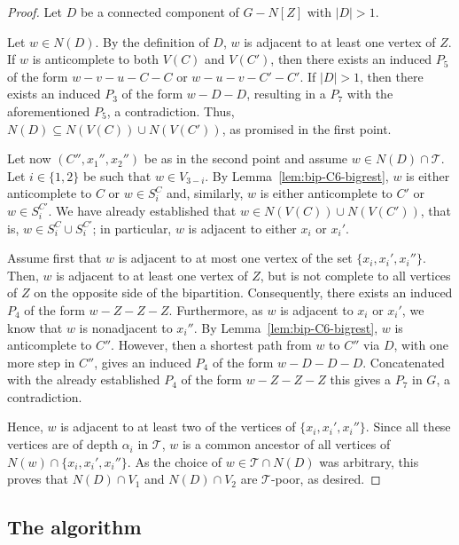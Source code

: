 \documentclass[11pt,a4paper]{article}
\theoremstyle{definition}
\def\T{\mathcal{T}}
\begin{document}
\begin{proof}
    Let $D$ be a connected component of $G-N[Z]$ with $|D| > 1$. 
    
    Let $w \in N(D)$. 
    By the definition of $D$, $w$ is adjacent to at least one vertex
    of $Z$.
    If $w$ is anticomplete to both $V(C)$ and $V(C')$, then 
    there exists an induced $P_5$ of the form $w-v-u-C-C$ or $w-u-v-C'-C'$. 
    If $|D| > 1$, then there exists an induced $P_3$ of the form $w-D-D$,
    resulting in a $P_7$ with the aforementioned $P_5$, a contradiction.
    Thus, $N(D) \subseteq N(V(C)) \cup N(V(C'))$, as promised in the first point.

    Let now $(C'',x_1'',x_2'')$ be as in the second point and assume $w \in N(D) \cap \T$. 
    Let $i \in \{1,2\}$ be such that $w \in V_{3-i}$. 
    By Lemma~\ref{lem:bip-C6-bigrest}, $w$ is either anticomplete to $C$ or
    $w \in S_i^C$ and, similarly, $w$ is either anticomplete to $C'$
    or $w \in S_i^{C'}$. 
    We have already established that $w \in N(V(C)) \cup N(V(C'))$, that is,
    $w \in S_i^C \cup S_i^{C'}$;
    in particular, $w$ is adjacent to either $x_i$ or $x_i'$.

    Assume first that  $w$ is adjacent to at most one vertex of the set  $\{x_i,x_i',x_i''\}$.
    Then, $w$ is adjacent to at least one vertex of $Z$,
    but is not complete to all vertices of $Z$ on the opposite side of the bipartition.
    Consequently, there exists an induced $P_4$ of the form $w-Z-Z-Z$.
    Furthermore, as $w$ is adjacent to $x_i$ or $x_i'$, we know that $w$ is nonadjacent to $x_i''$. 
    By Lemma~\ref{lem:bip-C6-bigrest}, $w$ is anticomplete to $C''$. 
    However, then a shortest path from $w$
    to $C''$ via $D$, with one more step in $C''$, gives an induced $P_4$ of the form $w-D-D-D$.
    Concatenated with the already established $P_4$ of the form $w-Z-Z-Z$ this gives a $P_7$
    in $G$, a contradiction.

    Hence, $w$ is adjacent to at least two of the vertices of
    $\{x_i,x_i',x_i''\}$. Since all these vertices are of depth $\alpha_i$
    in $\T$, $w$ is a common ancestor of all vertices of $N(w) \cap \{x_i,x_i',x_i''\}$.
    As the choice of $w \in \T \cap N(D)$ was arbitrary,
    this proves that $N(D) \cap V_1$ and $N(D) \cap V_2$ are $\T$-poor, as desired.
\end{proof}


\subsection{The algorithm}
\newcommand{\LiveClasses}{\mathsf{ActiveCls}}
\newcommand{\richclass}{\mathsf{c}}
\newcommand{\hbound}{h_\mathrm{max}}
\newcommand{\bigbound}{d_{\mathrm{max}}}
\newcommand{\hugebound}{d_{\mathrm{max},2}}
\newcommand{\poorcomps}{D_{\mathrm{poor}}}
\end{document}
